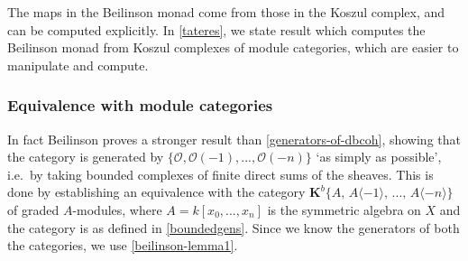 \documentclass[a4paper]{article}
\theoremstyle{definition}
\theoremstyle{remark}
\begin{document}
The maps in the Beilinson monad come from those in the Koszul complex, and can
be computed explicitly. In \cref{tateres}, we state
 result which computes the Beilinson monad
from Koszul complexes of module categories, which are easier to manipulate and
compute.

\subsubsection{Equivalence with module categories}

In fact Beilinson proves a stronger result than \cref{generators-of-dbcoh},
showing that the category is generated by
\(\{\mathscr{O},\mathscr{O}(-1),...,\mathscr{O}(-n)\}\) `as simply as possible',
i.e.\ by taking bounded complexes of finite direct sums of the sheaves. This is
done by establishing an equivalence with the category \(\mathbf{K}^b\{A,\,
A\langle -1 \rangle,\,...,\, A\langle -n\rangle\}\) of graded \(A\)-modules,
where \(A=k[x_0,...,x_n]\) is the symmetric algebra on \(X\) and the category is
as defined in \cref{boundedgens}. Since we know the generators of
both the categories, we use \cref{beilinson-lemma1}.
\end{document}

